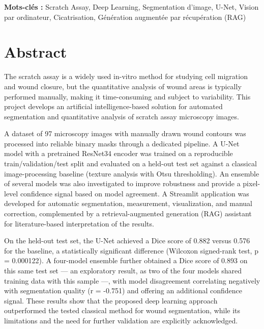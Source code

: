 \documentclass[12pt,a4paper]{report}
\begin{document}
\vspace{0.3cm}
\noindent
\textbf{Mots-clés :} Scratch Assay, Deep Learning, Segmentation d'image, U-Net, Vision par ordinateur, Cicatrisation, Génération augmentée par récupération (RAG)

\chapter*{Abstract}

\noindent
\hspace{1cm}The scratch assay is a widely used in-vitro method for studying cell migration and wound closure, but the quantitative analysis of wound areas is typically performed manually, making it time-consuming and subject to variability. This project develops an artificial intelligence-based solution for automated segmentation and quantitative analysis of scratch assay microscopy images.

\vspace{0.3cm}
\noindent
\hspace{1cm}A dataset of 97 microscopy images with manually drawn wound contours was processed into reliable binary masks through a dedicated pipeline. A U-Net model with a pretrained ResNet34 encoder was trained on a reproducible train/validation/test split and evaluated on a held-out test set against a classical image-processing baseline (texture analysis with Otsu thresholding). An ensemble of several models was also investigated to improve robustness and provide a pixel-level confidence signal based on model agreement. A Streamlit application was developed for automatic segmentation, measurement, visualization, and manual correction, complemented by a retrieval-augmented generation (RAG) assistant for literature-based interpretation of the results.

\vspace{0.3cm}
\noindent
\hspace{1cm}On the held-out test set, the U-Net achieved a Dice score of 0.882 versus 0.576 for the baseline, a statistically significant difference (Wilcoxon signed-rank test, p = 0.000122). A four-model ensemble further obtained a Dice score of 0.893 on this same test set --- an exploratory result, as two of the four models shared training data with this sample ---, with model disagreement correlating negatively with segmentation quality (r = -0.751) and offering an additional confidence signal. These results show that the proposed deep learning approach outperformed the tested classical method for wound segmentation, while its limitations and the need for further validation are explicitly acknowledged.
\end{document}
